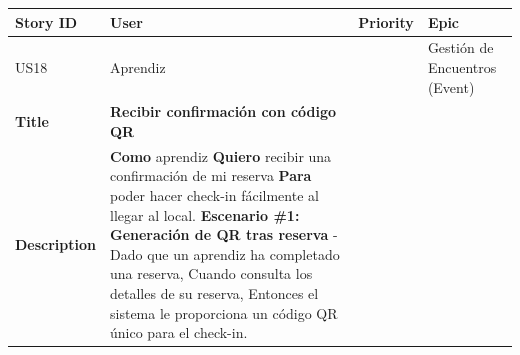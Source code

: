 {\def\LTcaptype{none} %
\begin{longtable}[]{@{}
  >{\raggedright\arraybackslash}p{}
  >{\raggedright\arraybackslash}p{}
  >{\raggedright\arraybackslash}p{}
  >{\raggedright\arraybackslash}p{}@{}}
\toprule\noalign{}
\begin{minipage}[b]{\linewidth}\raggedright
Story ID
\end{minipage} & \begin{minipage}[b]{\linewidth}\raggedright
User
\end{minipage} & \begin{minipage}[b]{\linewidth}\raggedright
Priority
\end{minipage} & \begin{minipage}[b]{\linewidth}\raggedright
Epic
\end{minipage} \\
\midrule\noalign{}
\endhead
\bottomrule\noalign{}
\endlastfoot
US18 & Aprendiz & 5 & Gestión de Encuentros (Event) \\
\textbf{Title} & \textbf{Recibir confirmación con código QR} & & \\
\textbf{Description} & \textbf{Como} aprendiz \textbf{Quiero} recibir
una confirmación de mi reserva \textbf{Para} poder hacer check-in
fácilmente al llegar al local. \textbf{Escenario \#1: Generación de QR
tras reserva} - Dado que un aprendiz ha completado una reserva, Cuando
consulta los detalles de su reserva, Entonces el sistema le proporciona
un código QR único para el check-in. & & \\
\end{longtable}
}

